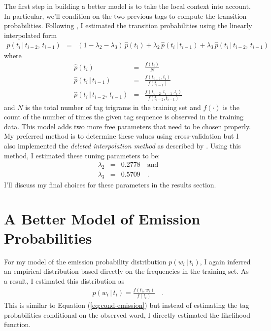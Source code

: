 \documentclass[11pt]{article}
\newcommand{\eq}[1]{Equation (\ref{eq:#1})}
\newcommand{\eqlabel}[1]{\label{eq:#1}}
\begin{document}
The first step in building a better model is to take the local context into
account.
In particular, we'll condition on the two previous tags to compute
the transition probabilities.
Following \citet{tnt}, I estimated the transition probabilities using the
linearly interpolated form
\begin{eqnarray}\eqlabel{trigram}
p(t_i\,|\, t_{i-2},\,t_{i-1}) & = &
    (1-\lambda_2-\lambda_3)\,\hat{p}(t_i) +
    \lambda_2\,\hat{p}(t_i\,|\,t_{i-1}) +
    \lambda_3\,\hat{p}(t_i\,|\,t_{i-2},\,t_{i-1})
\end{eqnarray}
where
\begin{eqnarray}
\hat{p}(t_i) &=& \frac{f(t_i)}{N} \\
\hat{p}(t_i\,|\,t_{i-1}) &=& \frac{f(t_{i-1},t_i)}{f(t_{i-1})} \\
\hat{p}(t_i\,|\,t_{i-2},\,t_{i-1}) &=&
    \frac{f(t_{i-2},t_{i-1},t_i)}{f(t_{i-2},t_{i-1})}
\end{eqnarray}
and $N$ is the total number of tag trigrams in the training set and $f(\cdot)$
is the count of the number of times the given tag sequence is observed in
the training data.
This model adds two more free parameters that need to be chosen properly.
My preferred method is to determine these values using cross-validation
but I also implemented the \emph{deleted interpolation method} as described
by \citet{tnt}.
Using this method, I estimated these tuning parameters to be:
\begin{eqnarray}
    \lambda_2 &=& 0.2778 \quad \mathrm{and} \nonumber\\
    \lambda_3 &=& 0.5709 \quad.
\end{eqnarray}
I'll discuss my final choices for these parameters in the results section.

\section{A Better Model of Emission Probabilities}

For my model of the emission probability distribution $p(w_i\,|\,t_i)$, I
again inferred an empirical distribution based directly on the frequencies in
the training set.
As a result, I estimated this distribution as
\begin{eqnarray}\eqlabel{emission}
p(w_i\,|\,t_i) = \frac{f(t_i,w_i)}{f(t_i)}\quad.
\end{eqnarray}
This is similar to \eq{cond-emission} but instead of estimating the tag
probabilities conditional on the observed word, I directly estimated the
likelihood function.
\end{document}
